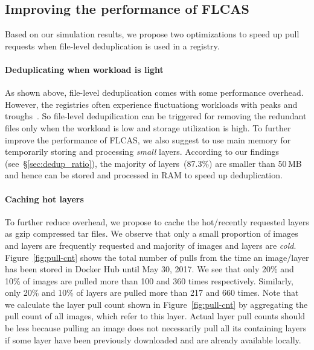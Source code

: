 
\subsection{Improving the performance of FLCAS}

Based on our simulation results, we propose two optimizations
to speed up pull requests when file-level deduplication is used
in a registry.

\paragraph{Deduplicating when workload is light}

As shown above, file-level deduplication comes with some performance overhead.
%
However, the registries often experience fluctuationg workloads with
peaks and troughs~\cite{dockerworkload}.
%
%
%
So file-level dedupilication can be triggered for removing the redundant files 
only when the workload is low and storage utilization is high.
%
To further improve the performance of FLCAS, we also suggest to use main memory
for temporarily storing and processing \textit{small} layers.
%
According to our findings (see~\S\ref{sec:dedup_ratio}), the majority of layers~(87.3\%)
are smaller than 50\,MB and hence can be stored and processed in RAM to speed up
deduplication. 



\paragraph{Caching hot layers}

To further reduce overhead, we propose to cache the hot/recently requested layers as
gzip compressed tar files.
%
We observe that only a small proportion of images
and layers are frequently requested and majority of images and layers are
\textit{cold}.
%
Figure~\ref{fig:pull-cnt} shows the total
number of pulls from the time an image/layer has been stored in Docker Hub until
May 30, 2017.
%
We see that only 20\% and 10\% of images are pulled more than 100 and
360 times respectively.
%
Similarly, only 20\% and 10\% of layers are pulled
more than 217 and 660 times.
%
Note that we calculate the layer pull count shown in
Figure~\ref{fig:pull-cnt} by aggregating the pull count of
all images, which refer to this layer.
%
%
Actual layer pull counts should be less because pulling an image does not
necessarily pull all its containing layers if some layer have been previously
downloaded and are already available locally.
%

